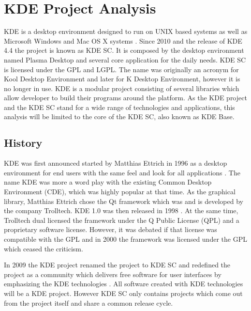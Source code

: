 \section{KDE Project Analysis} %


KDE is a desktop environment designed to run on UNIX based systems as well as
Microsoft Windows and Mac OS X systems \cite{KDEPress,KDEAbout}. Since 2010 and
the release of KDE 4.4 the project is known as \ac{KDE SC}. It is composed by
the desktop environment named Plasma Desktop and several core application for
the daily needs. \ac{KDE SC} is licensed under the \ac{GPL} and \ac{LGPL}. The
name was originally an acronym for Kool Desktop Environment and later for K
Desktop Environment, however it is no longer in use. KDE is a modular project
consisting of several libraries which allow developer to build their programs
around the platform. As the KDE project and the \ac{KDE SC} stand for a wide
range of technologies and applications, this analysis will be limited to the
core of the \ac{KDE SC}, also known as KDE Base.

\subsection{History} %

KDE was first announced started by Matthias Ettrich in 1996 as a desktop
environment for end users with the same feel and look for all applications
\cite{KDEAnnouncement}. The name KDE was more a word play with the existing
Common Desktop Environment (CDE), which was highly popular at that time. As the
graphical library, Matthias Ettrich chose the Qt framework which was and is
developed by the company Trolltech. KDE 1.0 was then released in 1998
\cite{KDEHistory}. At the same time, Trolltech dual licensed the framework
under the Q Public License (QPL) and a proprietary software license. However,
it was debated if that license was compatible with the \ac{GPL} and in 2000 the
framework was licensed under the \ac{GPL} which ceased the criticism.

In 2009 the KDE project renamed the project to \ac{KDE SC} and redefined the
project as a community which delivers free software for user interfaces by
emphasizing the KDE technologies \cite{KDESC}. All software created with KDE
technologies will be a KDE project. However \ac{KDE SC} only contains projects
which come out from the project itself and share a common release cycle.

